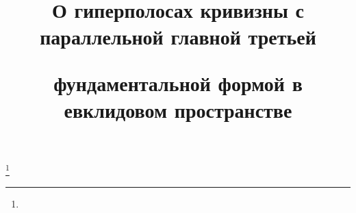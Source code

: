 




%







\setcounter{page}{63}















\author{}




\title{О гиперполосах кривизны с параллельной главной третьей


фундаментальной формой в евклидовом пространстве}


\thanks{}





\date{}




\pagestyle{plain} %







\maketitle


\label{begin}














